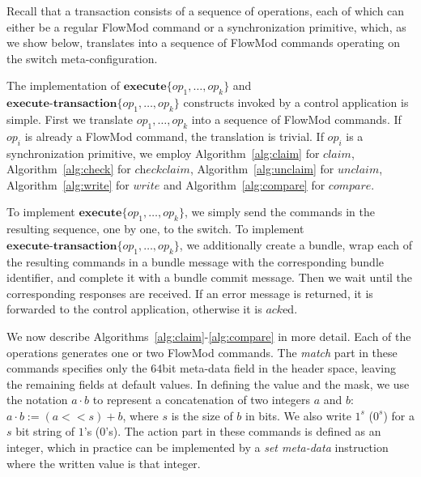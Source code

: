 \documentclass[conference]{sigcomm-alternate}
\newcommand{\concat}[0]{\cdot}
\newcommand{\exec}{\textbf{execute}}
\newcommand{\execatomic}{\textbf{execute-transaction}}
\newcommand{\ack}{\textit{ack}}
\newcommand{\ones}[1]{1^{#1}}
\newcommand{\zeros}[1]{0^{#1}}
\begin{document}
Recall that a transaction consists of a sequence of operations,
each of which can either be a regular FlowMod command or a synchronization
primitive, which, as we
show below, translates into a sequence of FlowMod commands operating on the
switch meta-configuration.

The implementation of $\exec\{op_1,\ldots,op_k\}$ and
$\execatomic\{op_1,\ldots,op_k\}$ constructs
invoked by a control application is simple.
First we translate  $op_1,\ldots,op_k$ into a sequence of FlowMod
commands. If $op_i$ is already a FlowMod command, the translation is
trivial. If $op_i$ is a synchronization primitive, we employ
Algorithm~\ref{alg:claim} for $\textit{claim}$,
Algorithm~\ref{alg:check} for $\textit{checkclaim}$,
Algorithm~\ref{alg:unclaim}
for $\textit{unclaim}$,
Algorithm~\ref{alg:write} for $\textit{write}$ and
Algorithm~\ref{alg:compare} for $\textit{compare}$.

To implement  $\exec\{op_1,\ldots,op_k\}$, we simply send the commands in
the resulting sequence, one by one, to the switch.
%
To implement  $\execatomic\{op_1,\ldots,op_k\}$, we
additionally create a bundle, wrap each of the resulting commands in a
bundle message with the corresponding bundle identifier, and complete it
with a bundle commit message.
Then we wait until the
corresponding responses are received.
If an error message is returned,
it is forwarded to the control application,
otherwise it is $\ack$ed.

We now describe Algorithms~\ref{alg:claim}-\ref{alg:compare} in more
detail.
Each of the operations generates one or two FlowMod commands.
The \textit{match} part in these commands specifies only the $64$bit meta-data
field in the header space, leaving the remaining fields at default
values.
In defining the value and the mask,
we
use the notation $a\concat b$ to represent a concatenation of two
 integers $a$ and $b$: $a\concat b := (a<<s)+b$, where $s$ is the size of $b$ in bits.
We also write \texttt{$\ones{s}$} (\texttt{$\zeros{s}$}) for  a $s$ bit 
string of $1$'s ($0$'s).
%
The action part in these commands is defined as an integer, which in
practice can be implemented by a \emph{set meta-data} instruction where the written value is that integer.
\end{document}
